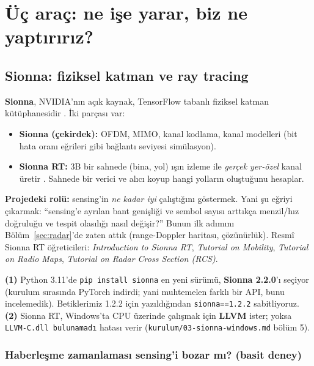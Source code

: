 \section{Üç araç: ne işe yarar, biz ne yaptırırız?}\label{sec:arac}

\subsection{Sionna: fiziksel katman ve ray tracing}\label{sec:sionna}

\textbf{Sionna}, NVIDIA'nın açık kaynak, TensorFlow tabanlı fiziksel katman kütüphanesidir \cite{sionna}. İki parçası var:
\begin{itemize}
\item \textbf{Sionna (çekirdek):} OFDM, MIMO, kanal kodlama, kanal modelleri (bit hata oranı eğrileri gibi bağlantı seviyesi simülasyon).
\item \textbf{Sionna RT:} 3B bir sahnede (bina, yol) ışın izleme ile \emph{gerçek yer-özel} kanal üretir \cite{sionnart}. Sahnede bir verici ve alıcı koyup hangi yolların oluştuğunu hesaplar.
\end{itemize}

\textbf{Projedeki rolü:} sensing'in \emph{ne kadar iyi} çalıştığını göstermek. Yani şu eğriyi çıkarmak: ``sensing'e ayrılan bant genişliği ve sembol sayısı arttıkça menzil/hız doğruluğu ve tespit olasılığı nasıl değişir?''
Bunun ilk adımını Bölüm~\ref{sec:radar}'de zaten attık (range-Doppler haritası, çözünürlük). Resmî Sionna RT öğreticileri: \emph{Introduction to Sionna RT}, \emph{Tutorial on Mobility},
\emph{Tutorial on Radio Maps}, \emph{Tutorial on Radar Cross Section (RCS)}.

\begin{bulgu}
\textbf{(1)} Python 3.11'de \texttt{pip install sionna} en yeni sürümü, \textbf{Sionna 2.2.0}'ı seçiyor (kurulum sırasında PyTorch indirdi; yani muhtemelen farklı bir API, bunu incelemedik). Betiklerimiz 1.2.2 için yazıldığından \texttt{sionna==1.2.2} sabitliyoruz.
\textbf{(2)} Sionna RT, Windows'ta CPU üzerinde çalışmak için \textbf{LLVM} ister; yoksa \texttt{LLVM-C.dll bulunamadı} hatası verir (\texttt{kurulum/03-sionna-windows.md} bölüm 5).
\end{bulgu}

\subsubsection{Haberleşme zamanlaması sensing'i bozar mı? (basit deney)}

